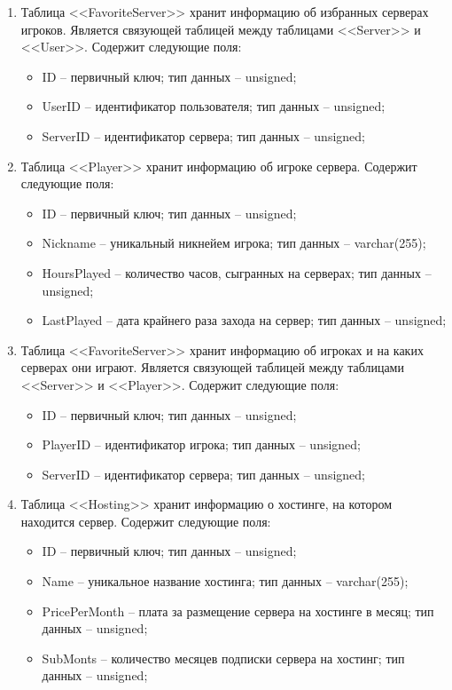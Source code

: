 \begin{enumerate}
        \item Таблица <<FavoriteServer>> хранит информацию об избранных серверах игроков. Является связующей таблицей между таблицами <<Server>> и <<User>>. Содержит следующие поля:
        \begin{itemize}
            \item ID -- первичный ключ; тип данных -- unsigned;
            \item UserID -- идентификатор пользователя; тип данных -- unsigned;
            \item ServerID -- идентификатор сервера; тип данных -- unsigned;
        \end{itemize}

        \item Таблица <<Player>> хранит информацию об игроке сервера. Содержит следующие поля:
        \begin{itemize}
            \item ID -- первичный ключ; тип данных -- unsigned;
            \item Nickname -- уникальный никнейем игрока; тип данных -- varchar(255);
            \item HoursPlayed -- количество часов, сыгранных на серверах; тип данных -- unsigned;
            \item LastPlayed -- дата крайнего раза захода на сервер; тип данных -- unsigned;
        \end{itemize}

        \item Таблица <<FavoriteServer>> хранит информацию об игроках и на каких серверах они играют. Является связующей таблицей между таблицами <<Server>> и <<Player>>. Содержит следующие поля:
        \begin{itemize}
            \item ID -- первичный ключ; тип данных -- unsigned;
            \item PlayerID -- идентификатор игрока; тип данных -- unsigned;
            \item ServerID -- идентификатор сервера; тип данных -- unsigned;
        \end{itemize}

        \item Таблица <<Hosting>> хранит информацию о хостинге, на котором находится сервер. Содержит следующие поля:
        \begin{itemize}
            \item ID -- первичный ключ; тип данных -- unsigned;
            \item Name -- уникальное название хостинга; тип данных -- varchar(255);
            \item PricePerMonth -- плата за размещение сервера на хостинге в месяц; тип данных -- unsigned;
            \item SubMonts -- количество месяцев подписки сервера на хостинг; тип данных -- unsigned;
        \end{itemize}


\end{enumerate}

